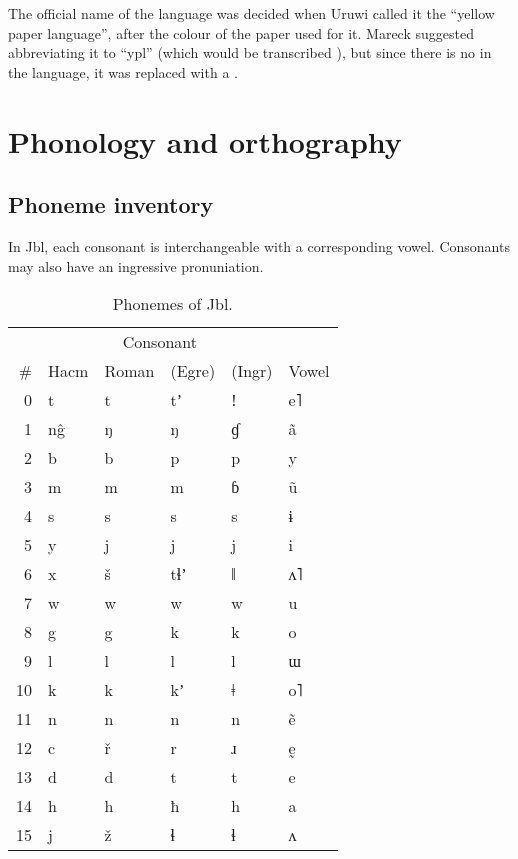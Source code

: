 \documentclass{book}
\newcommand{\lname}{Jbl}
\begin{document}
The official name of the language was decided when Uruwi called it the ``yellow paper language'', after the colour of the paper used for it. Mareck suggested abbreviating it to ``ypl'' (which would be transcribed ), but since there is no  in the language, it was replaced with a .

\chapter{Phonology and orthography}

\section{Phoneme inventory}


In \lname{}, each consonant is interchangeable with a corresponding vowel. Consonants may also have an ingressive pronuniation.

\begin{table}[h]
  \caption{Phonemes of \lname.}
  \centering
  \begin{tabular}{r>{\kardinal}lllll}
    & & \multicolumn{2}{c}{Consonant} & \\
    \# & \textnormal{Hacm} & Roman & (Egre) & (Ingr) & Vowel \\
    \hline
    0 & t & t & tʼ & ǃ & e˥ \\
    1 & n\^g & ŋ & ŋ & ɠ & ã \\
    2 & b & b & p & p & y \\
    3 & m & m & m & ɓ & ũ \\
    4 & s & s & s & s & ɨ \\
    5 & y & j & j & j & i \\
    6 & x & š & tɬʼ & ǁ & ʌ˥ \\
    7 & w & w & w & w & u \\
    8 & g & g & k & k & o \\
    9 & l & l & l & l & ɯ \\
    10 & k & k & kʼ & ǂ & o˥ \\
    11 & n & n & n & n & ẽ \\
    12 & c & ř & r & ɹ & ḛ \\
    13 & d & d & t & t & e \\
    14 & h & h & ħ & h & a \\
    15 & j & ž & ɬ & ɬ & ʌ \\
   \end{tabular}
\end{table}
\end{document}
